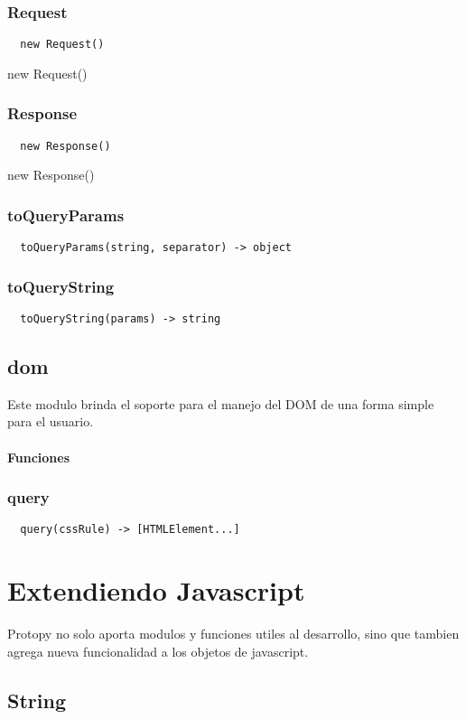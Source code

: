 \subsubsection*{Request}
\begin{verbatim}
  new Request()
\end{verbatim}
new Request()
\subsubsection*{Response}
\begin{verbatim}
  new Response()
\end{verbatim}
new Response()
\subsubsection*{toQueryParams}
\begin{verbatim}
  toQueryParams(string, separator) -> object
\end{verbatim}
\subsubsection*{toQueryString}
\begin{verbatim}
  toQueryString(params) -> string
\end{verbatim}

\subsection{dom}
Este modulo brinda el soporte para el manejo del DOM de una forma simple para el
usuario.
\paragraph{Funciones}
\subsubsection*{query}
\begin{verbatim}
  query(cssRule) -> [HTMLElement...]
\end{verbatim}

\section{Extendiendo Javascript}
Protopy no solo aporta modulos y funciones utiles al desarrollo, sino que
tambien agrega nueva funcionalidad a los objetos de javascript.

\subsection{String}
